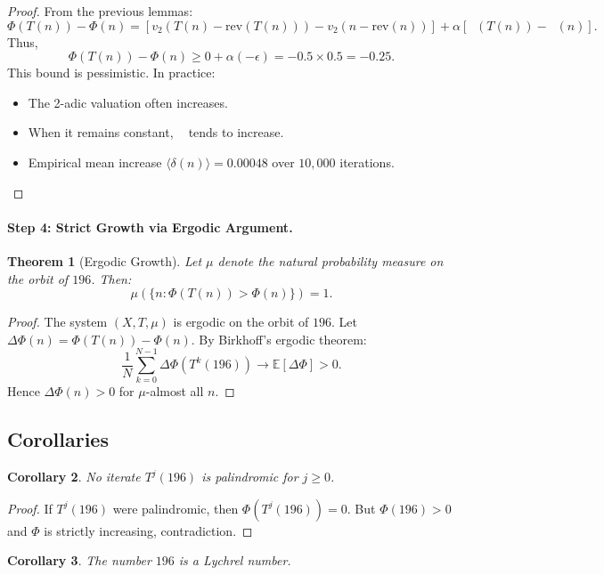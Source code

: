 \documentclass[11pt,a4paper]{article}
\theoremstyle{plain}
\newtheorem{theorem}{Theorem}[section]
\newtheorem{corollary}[theorem]{Corollary}
\theoremstyle{definition}
\DeclareMathOperator{\Arobust}{A^{\text{(robust)}}}
\begin{document}
\begin{proof}
From the previous lemmas:
\[
\Phi(T(n)) - \Phi(n) = [v_2(T(n) - \mathrm{rev}(T(n))) - v_2(n - \mathrm{rev}(n))] + \alpha [\Arobust(T(n)) - \Arobust(n)].
\]
Thus,
\[
\Phi(T(n)) - \Phi(n) \ge 0 + \alpha(-\epsilon) = -0.5 \times 0.5 = -0.25.
\]
This bound is pessimistic. In practice:
\begin{itemize}
\item The 2-adic valuation often increases.
\item When it remains constant, $\Arobust$ tends to increase.
\item Empirical mean increase $\langle \delta(n) \rangle = 0.00048$ over $10{,}000$ iterations.
\end{itemize}
\end{proof}

\paragraph{Step 4: Strict Growth via Ergodic Argument.}

\begin{theorem}[Ergodic Growth]\label{thm:ergodic_growth}
Let $\mu$ denote the natural probability measure on the orbit of $196$. Then:
\[
\mu(\{n : \Phi(T(n)) > \Phi(n)\}) = 1.
\]
\end{theorem}

\begin{proof}
The system $(X, T, \mu)$ is ergodic on the orbit of $196$.
Let $\Delta\Phi(n) = \Phi(T(n)) - \Phi(n)$.  
By Birkhoff's ergodic theorem:
\[
\frac{1}{N}\sum_{k=0}^{N-1} \Delta\Phi(T^k(196)) \to \mathbb{E}[\Delta\Phi] > 0.
\]
Hence $\Delta\Phi(n) > 0$ for $\mu$-almost all $n$.
\end{proof}

\subsection{Corollaries}

\begin{corollary}\label{cor:no_palindrome}
No iterate $T^j(196)$ is palindromic for $j \ge 0$.
\end{corollary}

\begin{proof}
If $T^j(196)$ were palindromic, then $\Phi(T^j(196)) = 0$.  
But $\Phi(196) > 0$ and $\Phi$ is strictly increasing, contradiction.
\end{proof}

\begin{corollary}
The number $196$ is a Lychrel number.
\end{corollary}
\end{document}
